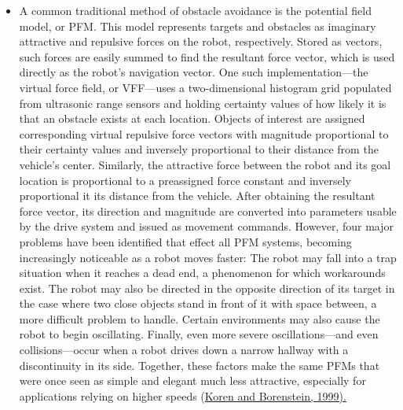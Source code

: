 \documentclass[12pt]{report}
\begin{document}
\begin{itemize}
\item{A common traditional method of obstacle avoidance is the potential field model, or PFM.  This model represents targets and obstacles as imaginary attractive and repulsive forces on the robot, respectively.  Stored as vectors, such forces are easily summed to find the resultant force vector, which is used directly as the robot's navigation vector.  One such implementation---the virtual force field, or VFF---uses a two-dimensional histogram grid populated from ultrasonic range sensors and holding certainty values of how likely it is that an obstacle exists at each location.  Objects of interest are assigned corresponding virtual repulsive force vectors with magnitude proportional to their certainty values and inversely proportional to their distance from the vehicle's center.  Similarly, the attractive force between the robot and its goal location is proportional to a preassigned force constant and inversely proportional it its distance from the vehicle.  After obtaining the resultant force vector, its direction and magnitude are converted into parameters usable by the drive system and issued as movement commands.  However, four major problems have been identified that effect all PFM systems, becoming increasingly noticeable as a robot moves faster:  The robot may fall into a trap situation when it reaches a dead end, a phenomenon for which workarounds exist.  The robot may also be directed in the opposite direction of its target in the case where two close objects stand in front of it with space between, a more difficult problem to handle.  Certain environments may also cause the robot to begin oscillating.  Finally, even more severe oscillations---and even collisions---occur when a robot drives down a narrow hallway with a discontinuity in its side.  Together, these factors make the same PFMs that were once seen as simple and elegant much less attractive, especially for applications relying on higher speeds (\hyperref[bib:koren]{Koren and Borenstein, 1999).}}

\end{itemize}
\end{document}
